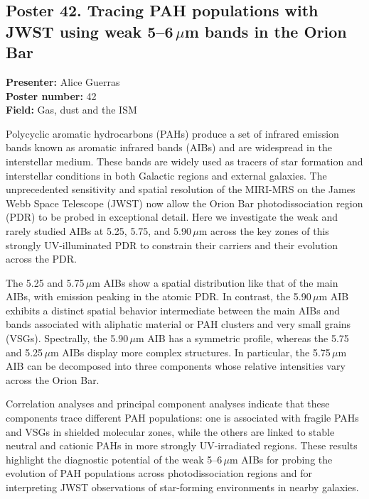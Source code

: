 \hypertarget{poster-abstract-talk-199}{}\label{poster-abstract-page-talk-199}
\subsection*{Poster 42. Tracing PAH populations with JWST using weak 5--6\,$\mu$m bands in the Orion Bar}
\textbf{Presenter:} Alice Guerras\\
\textbf{Poster number:} 42\\
\textbf{Field:} Gas, dust and the ISM

Polycyclic aromatic hydrocarbons (PAHs) produce a set of infrared emission bands known as aromatic infrared bands (AIBs) and are widespread in the interstellar medium. These bands are widely used as tracers of star formation and interstellar conditions in both Galactic regions and external galaxies. The unprecedented sensitivity and spatial resolution of the MIRI-MRS on the James Webb Space Telescope (JWST) now allow the Orion Bar photodissociation region (PDR) to be probed in exceptional detail. Here we investigate the weak and rarely studied AIBs at 5.25, 5.75, and 5.90\,$\mu$m across the key zones of this strongly UV-illuminated PDR to constrain their carriers and their evolution across the PDR.

The 5.25 and 5.75\,$\mu$m AIBs show a spatial distribution like that of the main AIBs, with emission peaking in the atomic PDR. In contrast, the 5.90\,$\mu$m AIB exhibits a distinct spatial behavior intermediate between the main AIBs and bands associated with aliphatic material or PAH clusters and very small grains (VSGs). Spectrally, the 5.90\,$\mu$m AIB has a symmetric profile, whereas the 5.75 and 5.25\,$\mu$m AIBs display more complex structures. In particular, the 5.75\,$\mu$m AIB can be decomposed into three components whose relative intensities vary across the Orion Bar.

Correlation analyses and principal component analyses indicate that these components trace different PAH populations: one is associated with fragile PAHs and VSGs in shielded molecular zones, while the others are linked to stable neutral and cationic PAHs in more strongly UV-irradiated regions. These results highlight the diagnostic potential of the weak 5--6\,$\mu$m AIBs for probing the evolution of PAH populations across photodissociation regions and for interpreting JWST observations of star-forming environments in nearby galaxies.

\hypertarget{poster-abstract-talk-207}{}\label{poster-abstract-page-talk-207}
